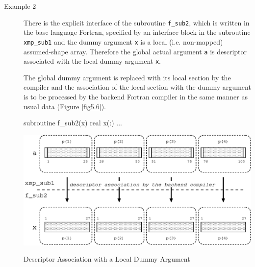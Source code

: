 \begin{description}
\item[Example 2]

	   There is the explicit interface of the subroutine
	   {\tt f\_sub2}, which is written in the base language Fortran,
	   specified by an interface block in the subroutine {\tt
	   xmp\_sub1} and the dummy argument {\tt x} is a local
	   (i.e. non-mapped) assumed-shape array. Therefore the global
	   actual argument {\tt a} is descriptor associated with the
	   local dummy argument {\tt x}.

	   The global dummy argument is replaced with its local section
	   by the {\XMP} compiler and the association of the local
	   section with the dummy argument is to be processed by the
	   backend Fortran compiler in the same manner as usual data 
	   (Figure \ref{fig5.6}).

\begin{Fexample}
      subroutine f_sub2(x)
      real x(:)
      ...
\end{Fexample}

\begin{myfigure}
 \includegraphics[scale=0.7]{figs/fig5.6.eps}
 \caption{Descriptor Association with a Local Dummy Argument}
 \label{fig5.6}
\end{myfigure}

\end{description}


